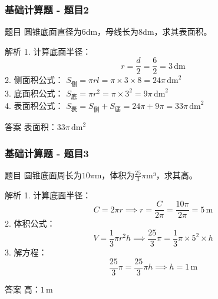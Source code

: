 \begin{frame}
    \frametitle{基础计算题 - 题目2}
    \begin{block}{题目}
        圆锥底面直径为6dm，母线长为8dm，求其表面积。
    \end{block}
    \pause
    
    \begin{block}{解析}
        1. 计算底面半径：
        \[
        r = \frac{d}{2} = \frac{6}{2} = 3 \, \text{dm}
        \]
        2. 侧面积公式：
        \(
        S_{\text{侧}} = \pi r l = \pi \times 3 \times 8 = 24\pi \, \text{dm}^2
        \)\\
        3. 底面积公式：
        \(
        S_{\text{底}} = \pi r^2 = \pi \times 3^2 = 9\pi \, \text{dm}^2
        \)\\
        4. 表面积公式：
        \(
        S_{\text{表}} = S_{\text{侧}} + S_{\text{底}} = 24\pi + 9\pi = 33\pi \, \text{dm}^2
        \)
    \end{block}
    
    \begin{alertblock}{答案}
        表面积：\(33\pi \, \text{dm}^2\)
    \end{alertblock}
\end{frame}

\begin{frame}
    \frametitle{基础计算题 - 题目3}
    \begin{block}{题目}
        圆锥底面周长为\(10\pi\)m，体积为\(\frac{25}{3}\pi\)m³，求其高。
    \end{block}
    \pause
    
    \begin{block}{解析}
        1. 计算底面半径：
        \[
        C = 2\pi r \implies r = \frac{C}{2\pi} = \frac{10\pi}{2\pi} = 5 \, \text{m}
        \]
        2. 体积公式：
        \[
        V = \frac{1}{3} \pi r^2 h \implies \frac{25}{3}\pi = \frac{1}{3} \pi \times 5^2 \times h
        \]
        3. 解方程：
        \[
        \frac{25}{3}\pi = \frac{25}{3}\pi h \implies h = 1 \, \text{m}
        \]
    \end{block}
    
    \begin{alertblock}{答案}
        高：\(1 \, \text{m}\)
    \end{alertblock}
\end{frame}


